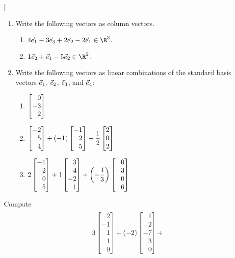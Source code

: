 \begin{exercises}
	\begin{problist}
		\prob[\beezer[VO.C10]] 
		\begin{enumerate}
			\item
				Write the following vectors as column vectors.
				\begin{enumerate}
					\item $4\sbasis{1} -3\sbasis{3} +2\sbasis{2} -2\sbasis{1}\in\R^3$.
					\item $1\sbasis{2} +\sbasis{1} -5\sbasis{2} \in\R^2$.
				\end{enumerate}
			\item
				Write the following vectors as linear combinations of the standard
				basis vectors $\vec { e}_{1}$, $\vec { e}_{2}$, $\vec { e}_{3}$, and
				$\vec { e}_{4}$:
				\begin{enumerate}
					\item $\mat{0\\-3\\2}$
					\item $\displaystyle
						\mat{-2\\5\\4} + (-1)\mat{-1\\2\\ 5} + \frac12\mat{2\\0\\2}$
					\item $\displaystyle
						2\mat{-1\\-2\\0\\ 5}
						+1\mat{3\\4\\-2\\ 1}
						+\left(-\frac13\right)\mat{0\\-3\\0\\ 6}$
				\end{enumerate}
		\end{enumerate}
		\prob
		Compute
		\[
			3\mat{2\\-1\\1\\1\\0}+
			(-2)\mat{1\\2\\-7\\3\\0}+
\]
\end{problist}
\end{exercises}
